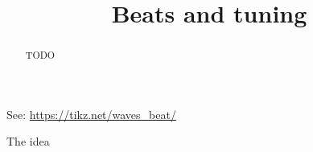 \documentclass[12pt,noauthor,nooutcomes]{ximera}
\author{}
\title{Beats and tuning}
\begin{document}
\begin{abstract}
  TODO
\end{abstract}
\maketitle


    See: \url{https://tikz.net/waves\_beat/}

\begin{question}
    The idea 
\end{question}




\begin{question}

\end{question}



\begin{question}
   
\end{question}




\begin{question}
\end{question}



\begin{question}




\end{question}
\end{document}
